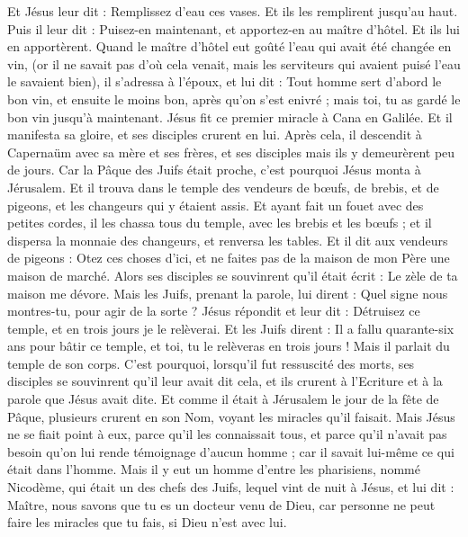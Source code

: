 \begin{multicols}{2}
Et Jésus leur dit : Remplissez d'eau ces vases. Et ils les remplirent jusqu'au haut.
Puis il leur dit : Puisez-en maintenant, et apportez-en au maître d'hôtel. Et ils lui en apportèrent.
Quand le maître d'hôtel eut goûté l'eau qui avait été changée en vin, (or il ne savait pas d'où cela venait, mais les serviteurs qui avaient puisé l'eau le savaient bien), il s'adressa à l'époux,
et lui dit : Tout homme sert d'abord le bon vin, et ensuite le moins bon, après qu'on s'est enivré ; mais toi, tu as gardé le bon vin jusqu'à maintenant.
Jésus fit ce premier miracle à Cana en Galilée. Et il manifesta sa gloire, et ses disciples crurent en lui.
Après cela, il descendit à Capernaüm avec sa mère et ses frères, et ses disciples mais ils y demeurèrent peu de jours.
Car la Pâque des Juifs était proche, c'est pourquoi Jésus monta à Jérusalem.
Et il trouva dans le temple des vendeurs de bœufs, de brebis, et de pigeons, et les changeurs qui y étaient assis.
Et ayant fait un fouet avec des petites cordes, il les chassa tous du temple, avec les brebis et les bœufs ; et il dispersa la monnaie des changeurs, et renversa les tables.
Et il dit aux vendeurs de pigeons : Otez ces choses d'ici, et ne faites pas de la maison de mon Père une maison de marché.
Alors ses disciples se souvinrent qu'il était écrit : Le zèle de ta maison me dévore.
Mais les Juifs, prenant la parole, lui dirent : Quel signe nous montres-tu, pour agir de la sorte ?
Jésus répondit et leur dit : Détruisez ce temple, et en trois jours je le relèverai.
Et les Juifs dirent : Il a fallu quarante-six ans pour bâtir ce temple, et toi, tu le relèveras en trois jours !
Mais il parlait du temple de son corps.
C'est pourquoi, lorsqu'il fut ressuscité des morts, ses disciples se souvinrent qu'il leur avait dit cela, et ils crurent à l'Ecriture et à la parole que Jésus avait dite.
Et comme il était à Jérusalem le jour de la fête de Pâque, plusieurs crurent en son Nom, voyant les miracles qu'il faisait.
Mais Jésus ne se fiait point à eux, parce qu'il les connaissait tous,
et parce qu'il n'avait pas besoin qu'on lui rende témoignage d'aucun homme ; car il savait lui-même ce qui était dans l'homme.
\VerseOne{}Mais il y eut un homme d'entre les pharisiens, nommé Nicodème, qui était un des chefs des Juifs,
lequel vint de nuit à Jésus, et lui dit : Maître, nous savons que tu es un docteur venu de Dieu, car personne ne peut faire les miracles que tu fais, si Dieu n'est avec lui.

\end{multicols}
